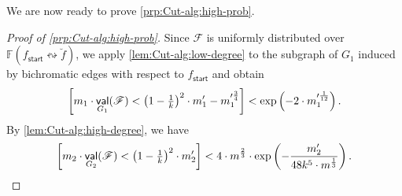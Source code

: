 \documentclass[11pt,fleqn]{article}
\newcommand{\reco}{\leftrightsquigarrow}
\DeclareMathOperator{\val}{\mathsf{val}}
\newcommand{\sss}{\mathsf{start}}
\newcommand{\f}{f}
\newcommand{\sqcol}{\scrF}
\newcommand{\stsqcol}{\bbF}
\newcommand{\bbF}{\mathbb{F}}
\newcommand{\scrF}{\mathscr{F}}
\let\Pr\relax\DeclareMathOperator*{\Pr}{\mathbb{P}}
\theoremstyle{definition}
\numberwithin{equation}{section}
\begin{document}
We are now ready to prove \cref{prp:Cut-alg:high-prob}.
\begin{proof}[Proof of \cref{prp:Cut-alg:high-prob}]
Since $\sqcol$ is uniformly distributed over $\stsqcol(\f_\sss \reco \breve{\f})$,
we apply \cref{lem:Cut-alg:low-degree} to
the subgraph of $G_1$ induced by bichromatic edges with respect to $\f_\sss$
and obtain
\begin{align}
\label{eq:Cut-alg:high-prob:low-degree}
\begin{aligned}
    \Pr\left[
        m_1 \cdot \val_{G_1}(\sqcol)
        < \left(1-\tfrac{1}{k}\right)^2 \cdot m_1' - m_1'^{\frac{3}{4}}
    \right]
    < \exp\left(-2\cdot m_1'^{\frac{1}{12}}\right).
\end{aligned}
\end{align}
By \cref{lem:Cut-alg:high-degree}, we have
\begin{align}
\label{eq:Cut-alg:high-prob:high-degree}
\Pr\left[
    m_2 \cdot \val_{G_2}(\sqcol)
    < \left(1-\tfrac{1}{k}\right)^2 \cdot m_2'
\right]
< 4 \cdot m^{\frac{2}{3}} \cdot \exp\left(
    -\frac{m_2'}{48 k^5 \cdot m^\frac{1}{3}}
\right).
\end{align}



\end{proof}
\end{document}
